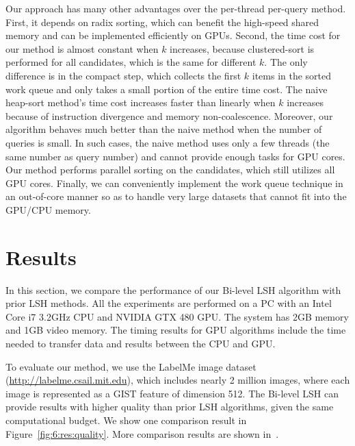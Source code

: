 Our approach has many other advantages over the per-thread per-query method. First, it depends on radix sorting, which can benefit the high-speed shared memory and can be implemented efficiently on GPUs.
Second, the time cost for our method is almost constant when $k$ increases, because clustered-sort is performed for all candidates, which is the same for different $k$. The only difference is in the compact step, which collects the first $k$ items in the sorted work queue and only takes a small portion of the entire time cost. The naive heap-sort method's time cost increases faster than linearly when $k$ increases because of instruction divergence and memory non-coalescence. Moreover, our algorithm behaves much better than the naive method when the number of queries is small. In such cases, the naive method uses only a few threads (the same number as query number) and cannot provide enough tasks for GPU cores. Our method performs parallel sorting on the candidates, which still utilizes all GPU cores. Finally, we can conveniently implement the work queue technique in an out-of-core manner so as to handle very large datasets that cannot fit into the GPU/CPU memory.


\section{Results}
\label{sec:6:res}
In this section, we compare the performance of our Bi-level LSH algorithm with prior LSH methods. All the experiments are performed on a PC with an Intel Core i7 3.2GHz CPU and NVIDIA GTX 480 GPU. The system has 2GB memory and 1GB video memory. The timing results for GPU algorithms include the time needed to transfer data and results between the CPU and GPU.

To evaluate our method, we use the LabelMe image dataset (\url{http://labelme.csail.mit.edu}), which includes nearly 2 million images, where each image is represented as a GIST feature of dimension 512. The Bi-level LSH can provide results with higher quality than prior LSH algorithms, given the same computational budget. We show one comparison result in Figure~\ref{fig:6:res:quality}. More comparison results are shown in~\cite{BilevelLSH2011}.

